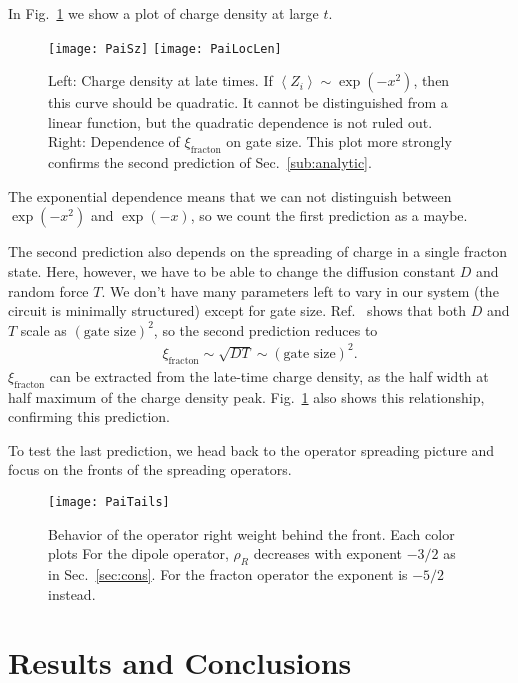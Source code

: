 \documentclass[a4paper,12pt]{article}
\newcommand{\ex}[1]{\left\langle #1 \right\rangle}
\begin{document}
In Fig.~\ref{fig:PaiSz} we show a plot of charge density at large $t$. 
\begin{figure}
	\centering
	\texttt{[image: PaiSz]}
	\texttt{[image: PaiLocLen]}
	\caption{Left: Charge density at late times. If $\ex{Z_i}\sim\exp(-x^2)$, then this curve should be quadratic. It cannot be distinguished from a linear function, but the quadratic dependence is not ruled out. Right: Dependence of $\xi_\text{fracton}$ on gate size. This plot more strongly confirms the second prediction of Sec.~\ref{sub:analytic}.}
	\label{fig:PaiSz}
\end{figure}
The exponential dependence means that we can not distinguish between $\exp(-x^2)$ and $\exp(-x)$, so we count the first prediction as a maybe. 

The second prediction also depends on the spreading of charge in a single fracton state. Here, however, we have to be able to change the diffusion constant $D$ and random force $T$. We don't have many parameters left to vary in our system (the circuit is minimally structured) except for gate size. Ref.~\cite{PaiFracton} shows that both $D$ and $T$ scale as $(\text{gate size})^2$, so the second prediction reduces to
\begin{align}
\xi_\text{fracton}\sim\sqrt{DT}\sim(\text{gate size})^2.
\end{align}
$\xi_\text{fracton}$ can be extracted from the late-time charge density, as the half width at half maximum of the charge density peak.
Fig.~\ref{fig:PaiSz} also shows this relationship, confirming this prediction.

To test the last prediction, we head back to the operator spreading picture and focus on the fronts of the spreading operators. 

\begin{figure}
	\centering
	\texttt{[image: PaiTails]}
	\caption{Behavior of the operator right weight behind the front. Each color plots For the dipole operator, $\rho_R$ decreases with exponent $-3/2$ as in Sec.~\ref{sec:cons}. For the fracton operator the exponent is $-5/2$ instead. }
	\label{fig:PaiTails}
\end{figure}


\section{Results and Conclusions} \label{sec:conc}

\nocite{apsrev41Control}

\end{document}
